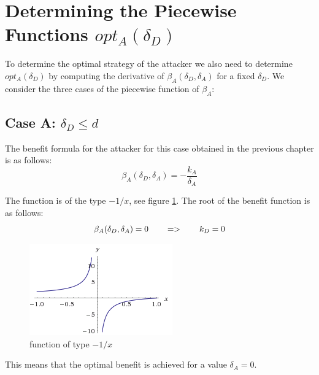 \section{Determining the Piecewise Functions $opt_{A}(\delta_{D})$}
To determine the optimal strategy of the attacker we also need to determine $opt_{A}(\delta_{D})$ by computing the derivative of $\beta_{A}(\delta_{D},\delta_{A})$ for a fixed $\delta_{D}$. We consider the three cases of the piecewise function of $\beta_{A}$: \\


\subsection*{Case A: $\delta_{D} \leq d$}

The benefit formula for the attacker for this case obtained in the previous chapter is as follows:
\begin{equation}
\beta_{A}(\delta_{D},\delta_{A}) =  - \dfrac{k_{A}}{\delta_{A}}
\end{equation}


The function is of the type $-1/x$, see figure \ref{1xx}. The root of the benefit function is as follows:
\begin{equation}
\beta_{A}(\delta_{D},\delta_{A}) =0  ~~~~~~ =>~~~~~~k_{D} = 0 \\
\end{equation}


\begin{figure}[hbtp]
\centering
\includegraphics[scale=1]{Images/1x.png}
\caption{function of type $-1/x$}
\label{1xx}
\end{figure}

This means that the optimal benefit is achieved for a value $\delta_{A}=0$.





